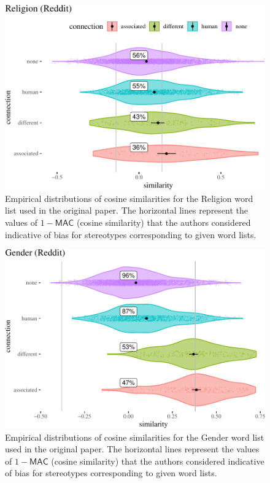 \documentclass{clv3}
\begin{document}
\begin{figure}

\begin{center}\includegraphics[width=0.7\linewidth]{figures/figcosineDistributions8d} \end{center}

\caption{Empirical distributions of cosine similarities  for the Religion word list  used in  the original paper.  The
	horizontal lines represent the values of \(1 - \mathsf{MAC}\) (cosine similarity) that the authors considered indicative of bias for stereotypes corresponding to given word lists. }

\label{fig:empirical0}
\end{figure}

\begin{figure}

\begin{center}\includegraphics[width=0.7\linewidth]{figures/figcosineDistributions8df} \end{center}

\caption{Empirical distributions of cosine similarities for the Gender word list used in  the original paper.  The
	horizontal lines represent the values of \(1 - \mathsf{MAC}\) (cosine similarity) that the authors considered indicative of bias for stereotypes corresponding to given word lists.}

\label{fig:empirical2}
\end{figure}
\end{document}

